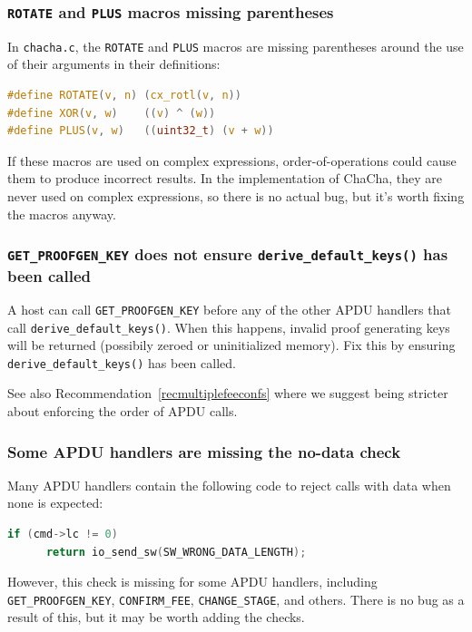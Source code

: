\documentclass[10pt,titlepage]{article}
\begin{document}
\subsubsection{\texttt{ROTATE} and \texttt{PLUS} macros missing parentheses}

In \texttt{chacha.c}, the \texttt{ROTATE} and \texttt{PLUS} macros are missing
parentheses around the use of their arguments in their definitions:

\begin{lstlisting}[language=c]
#define ROTATE(v, n) (cx_rotl(v, n))
#define XOR(v, w)    ((v) ^ (w))
#define PLUS(v, w)   ((uint32_t) (v + w))
\end{lstlisting}

If these macros are used on complex expressions, order-of-operations could cause
them to produce incorrect results. In the implementation of ChaCha, they are
never used on complex expressions, so there is no actual bug, but it's worth
fixing the macros anyway.

\subsubsection{\texttt{GET\_PROOFGEN\_KEY} does not ensure \texttt{derive\_default\_keys()} has been called}

A host can call \texttt{GET\_PROOFGEN\_KEY} before any of the other APDU
handlers that call \texttt{derive\_default\_keys()}. When this happens, invalid
proof generating keys will be returned (possibily zeroed or uninitialized
memory). Fix this by ensuring \texttt{derive\_default\_keys()} has been called.

See also Recommendation~\ref{recmultiplefeeconfs} where we suggest being
stricter about enforcing the order of APDU calls.

\subsubsection{Some APDU handlers are missing the no-data check}

Many APDU handlers contain the following code to reject calls with data when
none is expected:

\begin{lstlisting}[language=c]
if (cmd->lc != 0)
      return io_send_sw(SW_WRONG_DATA_LENGTH);
\end{lstlisting}

However, this check is missing for some APDU handlers, including
\texttt{GET\_PROOFGEN\_KEY}, \texttt{CONFIRM\_FEE}, \texttt{CHANGE\_STAGE}, and others.
There is no bug as a result of this, but it may be worth adding the checks.
\end{document}
